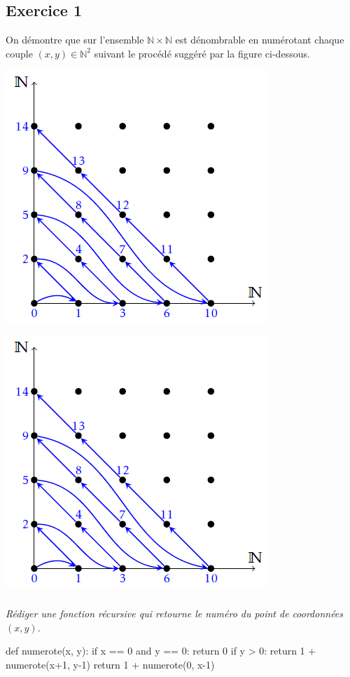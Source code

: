 \documentclass[10pt,fleqn]{book} %
\begin{document}

\vspace{7cm}
\pagestyle{fancy}
\thispagestyle{plain}

\setcounter{secnumdepth}{5}
\def\columnseprulecolor{\color{ocre}}
\setlength{\columnseprule}{0.4pt} 

\ifprof
\else
\begin{multicols}{2}
\fi


\section*{Exercice 1}
\setcounter{subparagraph}{0}
On démontre que sur l'ensemble $\mathbb{N}\times \mathbb{N}$ est dénombrable en numérotant chaque couple $(x,y)\in\mathbb{N}^2$ suivant le procédé suggéré par la figure ci-dessous.
\ifprof
\begin{center}
\includegraphics[width=.2\linewidth]{images/fig_01}
\end{center}
\else
\begin{center}
\includegraphics[width=.45\linewidth]{images/fig_01}
\end{center}
\fi

\subparagraph{}\textit{Rédiger une fonction récursive qui retourne le numéro du point de coordonnées $(x,y)$.}
\ifprof
\begin{corrige}
\begin{python}
def numerote(x, y):
    if x == 0 and y == 0:
        return 0
    if y > 0:
        return 1 + numerote(x+1, y-1)
    return 1 + numerote(0, x-1)
\end{python}
\end{corrige}
\else
\fi


\end{multicols}
\end{document}
